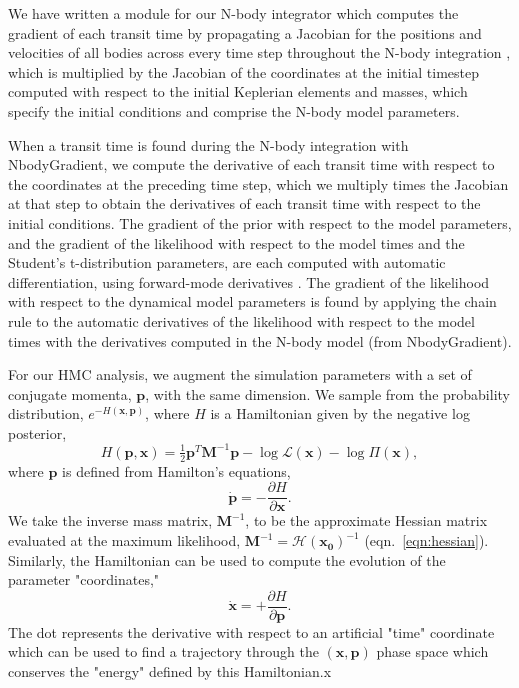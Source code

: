 \documentclass[twocolumn]{aastex63}
\begin{document}
We have written a module for our N-body integrator which computes the
gradient of each transit time by propagating a Jacobian for the positions
and velocities of all bodies across every time step throughout the N-body
integration \citep{Agol2020}, which is multiplied by the Jacobian of the coordinates at the initial timestep computed with respect to the initial Keplerian elements and masses, which specify the initial conditions and comprise the N-body model parameters.  

When a transit time is found during the N-body integration with \textsf{NbodyGradient}, we compute the derivative of each transit time with respect to 
the coordinates at the preceding time step, which we multiply times the Jacobian 
at that step to obtain the derivatives of each transit time with respect to the 
initial conditions. 
The gradient of the prior with respect to the model parameters, and the gradient of the likelihood with respect to the model times and the Student's t-distribution parameters, are each computed with automatic 
differentiation, using forward-mode derivatives  \citep{Revels2016}.  The gradient of the likelihood with
respect to the dynamical model parameters is found by applying the chain rule to the automatic derivatives of the likelihood with respect to the model times with the derivatives computed in the N-body model (from \textsf{NbodyGradient}).


For our HMC analysis, we augment the simulation parameters with a set of conjugate momenta, $\mathbf{p}$, with the same dimension. We sample from the probability distribution, $e^{-H(\mathbf{x},\mathbf{p})}$, where $H$ is a Hamiltonian given by the negative log posterior,
\begin{equation}
    H(\mathbf{p},\mathbf{x}) = \tfrac{1}{2} \mathbf{p}^T \mathbf{M}^{-1} \mathbf{p}
    - \log{\mathcal{L}}(\mathbf{x}) - \log{\Pi(\mathbf{x})},
\end{equation}
where $\mathbf{p}$ is defined from Hamilton's equations,
\begin{equation}
    \dot{\mathbf{p}} = -\frac{\partial H}{\partial \mathbf{x}}.
\end{equation}
We take the inverse mass matrix, $\mathbf{M}^{-1}$, to be the approximate Hessian matrix evaluated at the maximum likelihood, $\mathbf{M}^{-1} = \mathbf{\mathcal{H}(\mathbf{x}_0)}^{-1}$ (eqn.\ \ref{eqn:hessian}).
Similarly, the Hamiltonian can be used to compute the evolution of the parameter "coordinates,"
\begin{equation}
    \dot{\mathbf{x}} = +\frac{\partial H}{\partial \mathbf{p}}.
\end{equation}
The dot represents the derivative with respect to an artificial "time" coordinate which can be used to find a trajectory through the $(\mathbf{x},\mathbf{p})$ phase space which conserves the "energy" defined by this Hamiltonian.x
\end{document}
